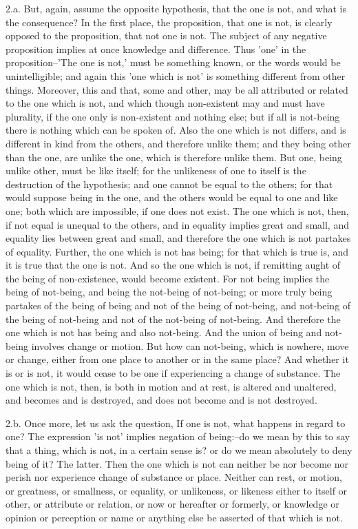 2.a. But, again, assume the opposite hypothesis, that the one is not,
and what is the consequence? In the first place, the proposition, that
one is not, is clearly opposed to the proposition, that not one is not.
The subject of any negative proposition implies at once knowledge and
difference. Thus 'one' in the proposition--'The one is not,' must be
something known, or the words would be unintelligible; and again this
'one which is not' is something different from other things. Moreover,
this and that, some and other, may be all attributed or related to
the one which is not, and which though non-existent may and must have
plurality, if the one only is non-existent and nothing else; but if all
is not-being there is nothing which can be spoken of. Also the one which
is not differs, and is different in kind from the others, and therefore
unlike them; and they being other than the one, are unlike the one,
which is therefore unlike them. But one, being unlike other, must be
like itself; for the unlikeness of one to itself is the destruction of
the hypothesis; and one cannot be equal to the others; for that would
suppose being in the one, and the others would be equal to one and like
one; both which are impossible, if one does not exist. The one which
is not, then, if not equal is unequal to the others, and in equality
implies great and small, and equality lies between great and small, and
therefore the one which is not partakes of equality. Further, the one
which is not has being; for that which is true is, and it is true that
the one is not. And so the one which is not, if remitting aught of the
being of non-existence, would become existent. For not being implies the
being of not-being, and being the not-being of not-being; or more truly
being partakes of the being of being and not of the being of not-being,
and not-being of the being of not-being and not of the not-being
of not-being. And therefore the one which is not has being and also
not-being. And the union of being and not-being involves change or
motion. But how can not-being, which is nowhere, move or change, either
from one place to another or in the same place? And whether it is or is
not, it would cease to be one if experiencing a change of substance. The
one which is not, then, is both in motion and at rest, is altered and
unaltered, and becomes and is destroyed, and does not become and is not
destroyed.

2.b. Once more, let us ask the question, If one is not, what happens in
regard to one? The expression 'is not' implies negation of being:--do we
mean by this to say that a thing, which is not, in a certain sense is?
or do we mean absolutely to deny being of it? The latter. Then the one
which is not can neither be nor become nor perish nor experience change
of substance or place. Neither can rest, or motion, or greatness, or
smallness, or equality, or unlikeness, or likeness either to itself or
other, or attribute or relation, or now or hereafter or formerly, or
knowledge or opinion or perception or name or anything else be asserted
of that which is not.

